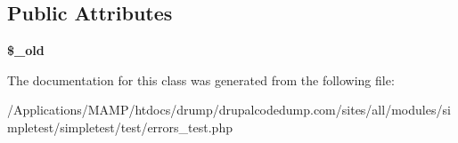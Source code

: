 \subsection*{Public Attributes}
\begin{DoxyCompactItemize}
\item 
\hypertarget{class_test_of_errors_ae58c2326c3b696b6029f97f8d26db4f9}{
{\bfseries \$\_\-old}}
\label{class_test_of_errors_ae58c2326c3b696b6029f97f8d26db4f9}

\end{DoxyCompactItemize}


The documentation for this class was generated from the following file:\begin{DoxyCompactItemize}
\item 
/Applications/MAMP/htdocs/drump/drupalcodedump.com/sites/all/modules/simpletest/simpletest/test/errors\_\-test.php\end{DoxyCompactItemize}

